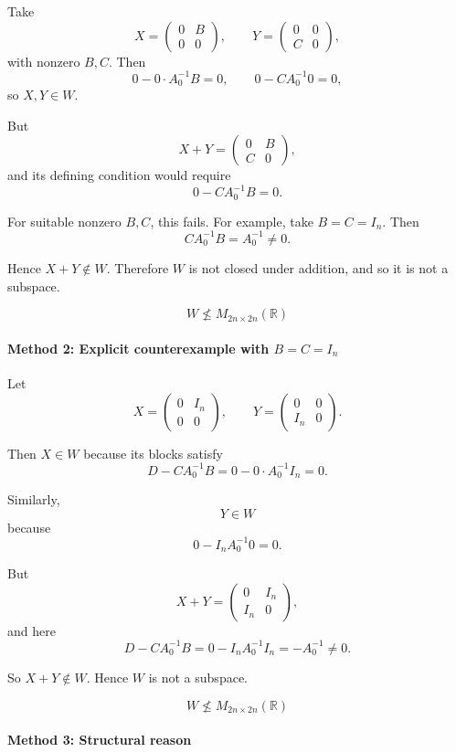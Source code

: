 \documentclass[12pt]{article}
\begin{document}
Take
\[
X=
\begin{pmatrix}
0 & B\\
0 & 0
\end{pmatrix},
\qquad
Y=
\begin{pmatrix}
0 & 0\\
C & 0
\end{pmatrix},
\]
with nonzero \(B,C\). Then
\[
0-0\cdot A_0^{-1}B=0,
\qquad
0-C A_0^{-1}0=0,
\]
so \(X,Y\in W\).

But
\[
X+Y=
\begin{pmatrix}
0 & B\\
C & 0
\end{pmatrix},
\]
and its defining condition would require
\[
0-CA_0^{-1}B=0.
\]

For suitable nonzero \(B,C\), this fails. For example, take \(B=C=I_n\). Then
\[
CA_0^{-1}B=A_0^{-1}\neq0.
\]

Hence \(X+Y\notin W\). Therefore \(W\) is not closed under addition, and so it is not a subspace.

\[
\boxed{W\not\le M_{2n\times 2n}(\mathbb R)}
\]

\paragraph{Method 2: Explicit counterexample with \(B=C=I_n\)}

Let
\[
X=
\begin{pmatrix}
0 & I_n\\
0 & 0
\end{pmatrix},
\qquad
Y=
\begin{pmatrix}
0 & 0\\
I_n & 0
\end{pmatrix}.
\]

Then \(X\in W\) because its blocks satisfy
\[
D-CA_0^{-1}B=0-0\cdot A_0^{-1}I_n=0.
\]

Similarly,
\[
Y\in W
\]
because
\[
0-I_n A_0^{-1}0=0.
\]

But
\[
X+Y=
\begin{pmatrix}
0 & I_n\\
I_n & 0
\end{pmatrix},
\]
and here
\[
D-CA_0^{-1}B=0-I_nA_0^{-1}I_n=-A_0^{-1}\neq0.
\]

So \(X+Y\notin W\). Hence \(W\) is not a subspace.

\[
\boxed{W\not\le M_{2n\times 2n}(\mathbb R)}
\]

\paragraph{Method 3: Structural reason}
\end{document}
